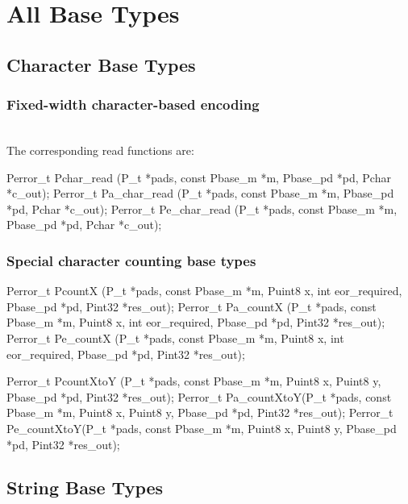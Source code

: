 \chapter{All \PADSL{} Base Types}
\label{ap:base-types}

\section{Character Base Types}

\subsection{Fixed-width character-based encoding}

\aedBegin{}
\aedEnd{}
\\[1ex]
The corresponding read functions are:
\begin{tinycodeaux}{\leftmargin=0in}
Perror_t Pchar_read   (P_t *pads, const Pbase_m *m, Pbase_pd *pd, Pchar *c_out);
Perror_t Pa_char_read (P_t *pads, const Pbase_m *m, Pbase_pd *pd, Pchar *c_out);
Perror_t Pe_char_read (P_t *pads, const Pbase_m *m, Pbase_pd *pd, Pchar *c_out);
\end{tinycodeaux}

\subsection{Special character counting base types}

\aedBegin{}
\aedEnd{}

\begin{tinycodeaux}{\leftmargin=0in}
Perror_t PcountX     (P_t *pads, const Pbase_m *m, Puint8 x, int eor_required,
		      Pbase_pd *pd, Pint32 *res_out);
Perror_t Pa_countX   (P_t *pads, const Pbase_m *m, Puint8 x, int eor_required,
		      Pbase_pd *pd, Pint32 *res_out);
Perror_t Pe_countX   (P_t *pads, const Pbase_m *m, Puint8 x, int eor_required,
		      Pbase_pd *pd, Pint32 *res_out);

Perror_t PcountXtoY  (P_t *pads, const Pbase_m *m, Puint8 x, Puint8 y,
		      Pbase_pd *pd, Pint32 *res_out);
Perror_t Pa_countXtoY(P_t *pads, const Pbase_m *m, Puint8 x, Puint8 y,
		      Pbase_pd *pd, Pint32 *res_out);
Perror_t Pe_countXtoY(P_t *pads, const Pbase_m *m, Puint8 x, Puint8 y,
		      Pbase_pd *pd, Pint32 *res_out);
\end{tinycodeaux}

\section{String Base Types}


